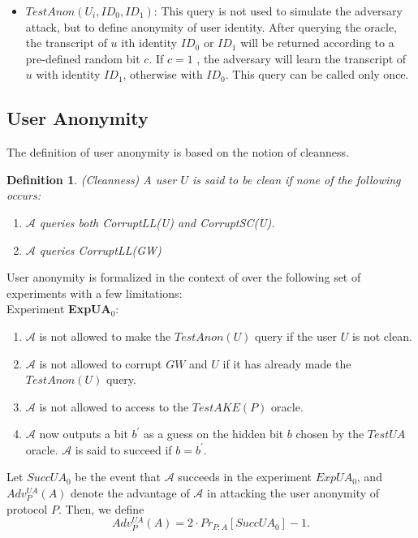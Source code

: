 \documentclass[a4paper,12pt]{report}
\newtheorem{definition}{Definition}
\begin{document}
\begin{itemize}
\item $TestAnon(U_{i},ID_{0},ID_{1})$: This query is not used to simulate the adversary attack, but to define anonymity of user identity. After querying the oracle, the transcript of $u$ ith identity $ID_0$ or $ID_1$ will be returned according to a pre-defined random bit $c$. If $c=1$ , the adversary will learn the transcript of $u$ with identity $ID_1$, otherwise with $ID_0$. This query can be called only once.\\
\end{itemize}



\subsection{User Anonymity}

The definition of user anonymity is based on the notion of cleanness.
\begin{definition}
(Cleanness) A user $U$ is said to be clean if none of the following occurs:
\begin{enumerate}
\item $\mathcal{A}$ queries both CorruptLL(U) and CorruptSC(U).
\item $\mathcal{A}$ queries CorruptLL(GW)
\end{enumerate}
\end{definition}
User anonymity is formalized  in the context of over the following set of experiments with a few limitations:\\
Experiment \textbf{ExpUA$_0$}:\\
\begin{enumerate}
\item $\mathcal{A}$ is not allowed to make the $TestAnon(U)$ query if the user $U$ is not clean.
\item $\mathcal{A}$ is not allowed to corrupt $GW$ and $U$ if it has already made the $TestAnon(U)$ query.
\item $\mathcal{A}$ is not allowed to access to the $TestAKE(P)$ oracle.
\item $\mathcal{A}$ now outputs a bit $b^{\prime}$ as a guess on the hidden bit $b$
chosen by the $TestUA$ oracle. $\mathcal{A}$ is said to succeed if $b = b^{\prime}$.
\end{enumerate}
Let $SuccUA_0$ be the event that $\mathcal{A}$ succeeds
in the experiment $ExpUA_0$, and $Adv^{UA}_{P}(A)$ denote the
advantage of $\mathcal{A}$ in attacking the user anonymity of
protocol $P$. Then, we define
\begin{equation}
Adv^{UA}_{P}(A) = 2 \cdot Pr_{P;A}[SuccUA_0]-1.
\label{eq}
\end{equation}
\end{document}
